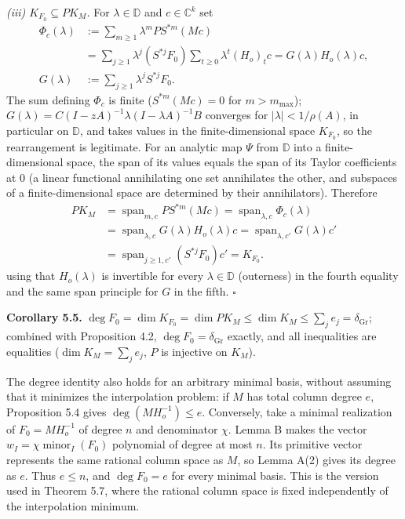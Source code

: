 \documentclass[
  11pt,
  a4paper,
]{article}
\begin{document}
\emph{(iii) \(K_{F_0}\subseteq PK_M\).} For \(\lambda\in\mathbb D\) and
\(c\in\mathbb C^k\) set
\[\begin{aligned}\Phi_c(\lambda)&:=\sum_{m\ge1}\lambda^mPS^{*m}(Mc)\\&=\sum_{j\ge1}\lambda^j(S^{*j}F_0)\sum_{t\ge0}\lambda^t(H_o)_tc=G(\lambda)H_o(\lambda)c,\\G(\lambda)&:=\sum_{j\ge1}\lambda^jS^{*j}F_0.\end{aligned}\]
The sum defining \(\Phi_c\) is finite (\(S^{*m}(Mc)=0\) for
\(m>m_{\max}\)); \(G(\lambda)=C(I-zA)^{-1}\lambda(I-\lambda A)^{-1}B\)
converges for \(|\lambda|<1/\rho(A)\), in particular on \(\mathbb D\),
and takes values in the finite-dimensional space \(K_{F_0}\), so the
rearrangement is legitimate. For an analytic map \(\Psi\) from
\(\mathbb D\) into a finite-dimensional space, the span of its values
equals the span of its Taylor coefficients at \(0\) (a linear functional
annihilating one set annihilates the other, and subspaces of a
finite-dimensional space are determined by their annihilators).
Therefore
\[\begin{aligned}PK_M&=\operatorname{span}_{m,c}PS^{*m}(Mc)=\operatorname{span}_{\lambda,c}\Phi_c(\lambda)\\&=\operatorname{span}_{\lambda,c}G(\lambda)H_o(\lambda)c=\operatorname{span}_{\lambda,c'}G(\lambda)c'\\&=\operatorname{span}_{j\ge1,c'}(S^{*j}F_0)c'=K_{F_0}.\end{aligned}\]
using that \(H_o(\lambda)\) is invertible for every
\(\lambda\in\mathbb D\) (outerness) in the fourth equality and the same
span principle for \(G\) in the fifth. \(\square\)

\textbf{Corollary 5.5.}
\(\deg F_0=\dim K_{F_0}=\dim PK_M\le\dim K_M\le\sum_je_j=\delta_{\mathrm{Gr}}\);
combined with Proposition 4.2, \(\deg F_0=\delta_{\mathrm{Gr}}\)
exactly, and all inequalities are equalities (\(\dim K_M=\sum_je_j\),
\(P\) is injective on \(K_M\)).

The degree identity also holds for an arbitrary minimal basis, without
assuming that it minimizes the interpolation problem: if \(M\) has total
column degree \(e\), Proposition 5.4 gives \(\deg(MH_o^{-1})\le e\).
Conversely, take a minimal realization of \(F_0=MH_o^{-1}\) of degree
\(n\) and denominator \(\chi\). Lemma B makes the vector
\(w_I=\chi\operatorname{minor}_I(F_0)\) polynomial of degree at most
\(n\). Its primitive vector represents the same rational column space as
\(M\), so Lemma A(2) gives its degree as \(e\). Thus \(e\le n\), and
\(\deg F_0=e\) for every minimal basis. This is the version used in
Theorem 5.7, where the rational column space is fixed independently of
the interpolation minimum.
\end{document}
